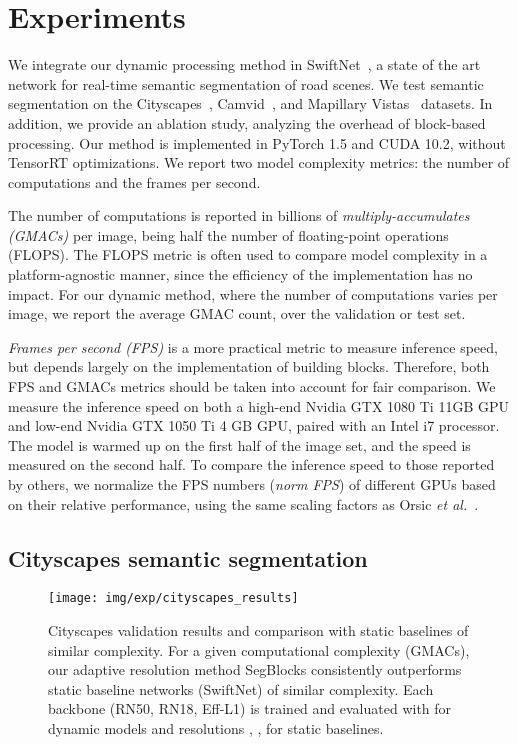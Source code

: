 

\section{Experiments}
We integrate our dynamic processing method in SwiftNet~\cite{orsic_defense_2019}, a state of the art network for real-time semantic segmentation of road scenes. We test semantic segmentation on the Cityscapes~\cite{cordts_cityscapes_2016}, Camvid~\cite{brostow2009semantic_camvid}, and Mapillary Vistas~\cite{neuhold_mapillary_2017} datasets. In addition, we provide an ablation study, analyzing the overhead of block-based processing. Our method is implemented in PyTorch 1.5 and CUDA 10.2, without TensorRT optimizations. We report two model complexity metrics: the number of computations and the frames per second.

{The number of computations} is reported in billions of \emph{multiply-accumulates (GMACs)} per image, being half the number of floating-point operations (FLOPS). The FLOPS metric is often used to compare model complexity in a platform-agnostic manner, since the efficiency of the implementation has no impact. 
For our dynamic method, where the number of computations varies per image, we report the average GMAC count, over the validation or test set.

\emph{Frames per second (FPS)} is a more practical metric to measure inference speed, but depends largely on the implementation of building blocks. 
Therefore, both FPS and GMACs metrics should be taken into account for fair comparison. 
We measure the inference speed on both a high-end Nvidia GTX 1080 Ti 11GB GPU and low-end Nvidia GTX 1050 Ti 4 GB GPU, paired with an Intel i7 processor. The model is warmed up on the first half of the image set, and the speed is measured on the second half. To compare the inference speed to those reported by others, we normalize the FPS numbers (\textit{norm FPS}) of different GPUs based on their relative performance, using the same scaling factors as Orsic \emph{et al.}~\cite{orsic_defense_2019}.

\subsection{Cityscapes semantic segmentation}

\begin{figure}[tb]
\centering
\texttt{[image: img/exp/cityscapes\_results]}
\caption{Cityscapes validation results and comparison with static baselines of similar complexity. For a given computational complexity (GMACs), our adaptive resolution method SegBlocks consistently outperforms static baseline networks (SwiftNet) of similar complexity. Each backbone (RN50, RN18, Eff-L1) is trained and evaluated with  for dynamic models and resolutions , ,  for static baselines.  }
\label{fig:cityscapes_results}
\end{figure}


